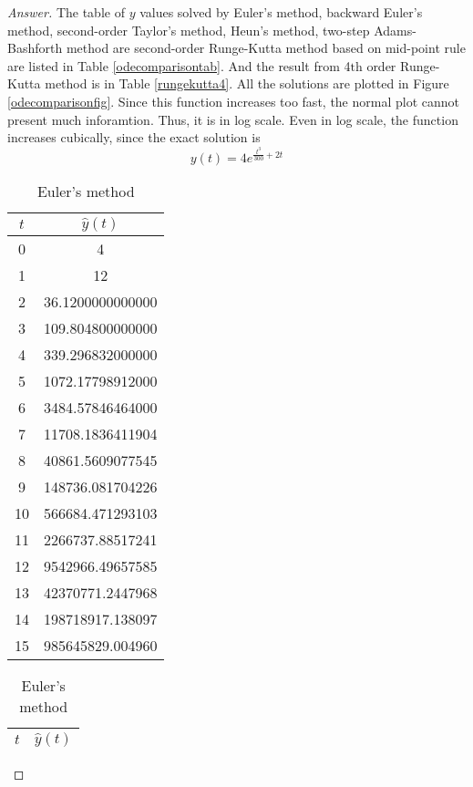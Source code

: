\begin{proof}[Answer]
The table of \(y\) values solved by Euler's method, backward Euler's method, second-order Taylor's method, Heun's method, two-step Adams-Bashforth method are second-order Runge-Kutta method based on mid-point rule are listed in Table \ref{odecomparisontab}.
And the result from 4\(\text{th}\) order Runge-Kutta method is in Table \ref{rungekutta4}.
All the solutions are plotted in Figure \ref{odecomparisonfig}.
Since this function increases too fast, the normal plot cannot present much inforamtion.
Thus, it is in log scale.
Even in log scale, the function increases cubically, since the exact solution is
\[ y(t)=4 e^{\frac{t^3}{300}+2 t} \]
\ifnum{}
	\begin{table}[H]
\else
	\begin{table}[htbp]
\fi
	\centering
	\begin{subtable}[t]{0.32\textwidth}
		\centering
		\begin{tabular}[t]{|c|c|}
		\hline
		\(t\)	&	\(\hat{y}(t)\)	\\	\hline
		0	&	4					\\	\hline
		1	&	12					\\	\hline
		2	&	36.1200000000000	\\	\hline
		3	&	109.804800000000	\\	\hline
		4	&	339.296832000000	\\	\hline
		5	&	1072.17798912000	\\	\hline
		6	&	3484.57846464000	\\	\hline
		7	&	11708.1836411904	\\	\hline
		8	&	40861.5609077545	\\	\hline
		9	&	148736.081704226	\\	\hline
		10	&	566684.471293103	\\	\hline
		11	&	2266737.88517241	\\	\hline
		12	&	9542966.49657585	\\	\hline
		13	&	42370771.2447968	\\	\hline
		14	&	198718917.138097	\\	\hline
		15	&	985645829.004960	\\	\hline
		\end{tabular}
		\caption{Euler's method}
	\end{subtable}
	\begin{subtable}[t]{0.32\textwidth}
		\centering
		\begin{tabular}[t]{|c|c|}
		\hline
		\(t\)	&	\(\hat{y}(t)\)	\\	\hline

\end{tabular}
\end{subtable}
\end{table}
\end{table}
\end{proof}
